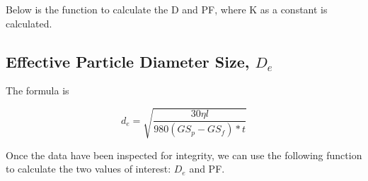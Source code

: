 \documentclass{tufte-handout}
\begin{document}
Below is the function to calculate the D and PF, where K as a constant is calculated. 

\subsection{Effective Particle Diameter Size, $D_e$}

The formula is 

\begin{equation}
d_e = \sqrt{\frac{30 \eta l}{980 (GS_p - GS_f)* t}}
\end{equation}

Once the data have been inspected for integrity, we can use the following function to calculate the two values of interest: $D_e$ and PF. 
\end{document}
